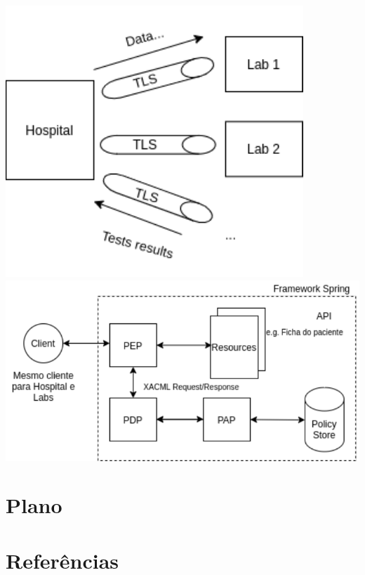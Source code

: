 	\includegraphics{figs/server_client.pdf}
	\includegraphics{figs/access_control.pdf}
	

\section{Plano}

\section{Referências}